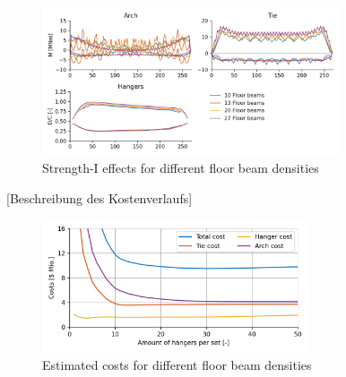 \begin{figure}[H]
    \centering
    \includegraphics[trim={0 0.4cm 0 0.4cm},clip, width=0.78\textwidth]{calculations/floor beam comparison/strength-I.png}
    \caption{Strength-I effects for different floor beam densities}
    \label{fig:fb_strength}
\end{figure}

[Beschreibung des Kostenverlaufs]

\begin{figure}[H]
    \centering
    \includegraphics[width=0.7\textwidth]{calculations/floor beam comparison/cost comparison.png}
    \caption{Estimated costs for different floor beam densities}
    \label{fig:fb_costs}
\end{figure}


\newpage
